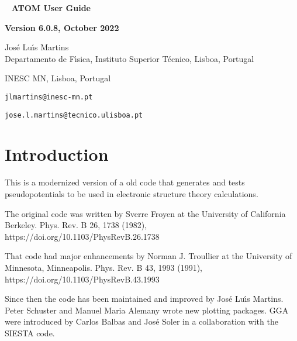 \documentclass[11pt]{article}
\begin{document}

\begin{titlepage}

\begin{center}
~
\vfill
\vspace{1cm}
{\Huge {\bf ATOM User Guide}}
\par\vspace{3cm}
\hrulefill
\par\vspace{3cm}
{\Large {\bf Version 6.0.8, October 2022}}
\par\vspace{2cm}
\hrulefill

{\Large Jos\'e Lu\'{\i}s Martins \\
Departamento de F\'{\i}sica, Instituto Superior T\'ecnico, Lisboa, Portugal

INESC MN, Lisboa, Portugal

\texttt{jlmartins@inesc-mn.pt}

\texttt{jose.l.martins@tecnico.ulisboa.pt}
}
\vfill
\end{center}

\end{titlepage}

\tableofcontents
\newpage

\section{Introduction}
\label{sec:intro}

This is a modernized version of a old code that generates and tests pseudopotentials to be
used in electronic structure theory calculations.

The original code was written by Sverre Froyen at the University of California Berkeley.
Phys. Rev. B 26, 1738 (1982), https://doi.org/10.1103/PhysRevB.26.1738

That code had major enhancements by Norman J. Troullier at the University of Minnesota, Minneapolis.
Phys. Rev. B 43, 1993 (1991), https://doi.org/10.1103/PhysRevB.43.1993

Since then the code has been maintained and improved by Jos\'e Lu\'{\i}s Martins.  Peter Schuster and Manuel Maria Alemany
wrote new plotting packages.  GGA were introduced by Carlos Balbas and José Soler in a collaboration
with the SIESTA code.
\end{document}

